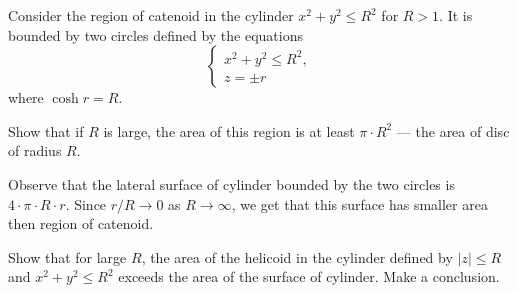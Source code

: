 Consider the region of catenoid in the cylinder $x^2+y^2\le R^2$ for $R>1$.
It is bounded by two circles defined by the equations 
\[
\begin{cases}
x^2+y^2\le R^2,
\\
z=\pm r
\end{cases}
\]
where $\cosh r=R$.

Show that if $R$ is large, the area of this region is at least $\pi\cdot R^2$ --- the area of disc of radius $R$.

Observe that the lateral surface of cylinder bounded by the two circles is $4\cdot \pi\cdot R\cdot r$.
Since $r/R\to 0$ as $R\to \infty$, we get that this surface has smaller area then region of catenoid.


Show that for large $R$, the area of the helicoid in the cylinder defined by $|z|\le R$ and $x^2+y^2\le R^2$ exceeds the area of the surface of cylinder.
Make a conclusion.
